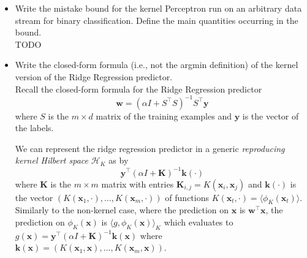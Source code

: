 \begin{itemize}
    \item Write the mistake bound for the kernel Perceptron run on an arbitrary data stream for binary classification. Define the main quantities occurring in the bound.\\ 
        
       TODO 

    \item Write the closed-form formula (i.e., not the argmin definition) of the kernel version of the Ridge Regression predictor.\\
        
    Recall the closed-form formula for the Ridge Regression predictor    
    $$ 
    \boldsymbol{w} = \left(\alpha I + S^\top S\right)^{-1} S^\top \boldsymbol{y}
    $$
    where $S$ is the $m \times d$ matrix of the training examples and $\boldsymbol{y}$ is the vector of the labels. 

    We can represent the ridge regression predictor in a generic \textit{reproducing kernel Hilbert space} $\mathcal{H}_K$ as by 
    $$
    \boldsymbol{y}^\top \left(\alpha I + \boldsymbol{K} \right)^{-1} \boldsymbol{k}(\cdot)
    $$ 
    where $\boldsymbol{K}$ is the $m \times m$ matrix with entries $\boldsymbol{K}_{i,j} = K(\boldsymbol{x}_i, \boldsymbol{x}_j)$ and $\boldsymbol{k}(\cdot)$ is the vector $\left(K(\boldsymbol{x}_1, \cdot), \dots, K(\boldsymbol{x}_m, \cdot)\right)$ of functions $K(\boldsymbol{x}_t, \cdot) = \langle \phi_K(\boldsymbol{x}_t) \rangle$.
    Similarly to the non-kernel case, where the prediction on $\boldsymbol{x}$ is $\boldsymbol{w}^\top \boldsymbol{x}$, the prediction on $\phi_K(\boldsymbol{x})$ is $\langle g, \phi_K(\boldsymbol{x})\rangle_K$ which evaluates to $g(\boldsymbol{x}) = \boldsymbol{y}^\top \left(\alpha I + \boldsymbol{K} \right)^{-1} \boldsymbol{k}(\boldsymbol{x})$ where $\boldsymbol{k}(\boldsymbol{x}) = \left( K(\boldsymbol{x}_1,\boldsymbol{x}), \dots, K(\boldsymbol{x}_m, \boldsymbol{x}) \right)$.
\end{itemize}
